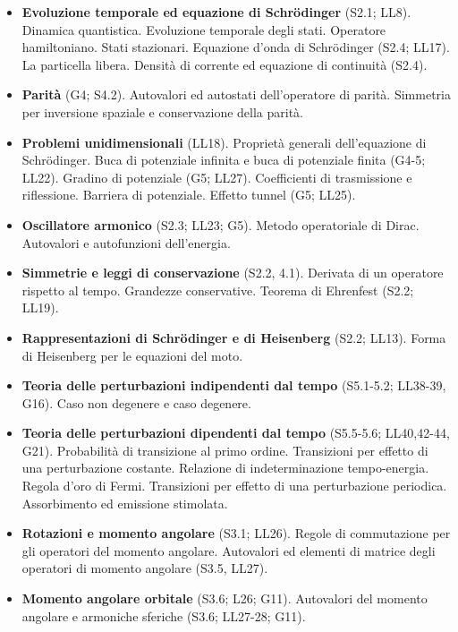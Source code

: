 \documentclass[a4paper,12pt,oneside]{book}
\begin{document}
\begin{itemize}
\item \textbf{Evoluzione temporale ed equazione di Schr\"{o}dinger} (S2.1; LL8). Dinamica quantistica. Evoluzione temporale degli stati. Operatore hamiltoniano. Stati stazionari. Equazione d'onda di Schr\"{o}dinger (S2.4; LL17). La particella libera. Densità di corrente ed equazione di continuità (S2.4).

\item \textbf{Parità} (G4; S4.2). Autovalori ed autostati dell'operatore di parità. Simmetria per inversione spaziale e conservazione della parità.

\item \textbf{Problemi unidimensionali} (LL18). Proprietà generali dell'equazione di Schr\"{o}dinger. Buca di potenziale infinita e buca di potenziale finita (G4-5; LL22). Gradino di potenziale (G5; LL27). Coefficienti di trasmissione e riflessione. Barriera di potenziale. Effetto tunnel (G5; LL25).

\item \textbf{Oscillatore armonico} (S2.3; LL23; G5). Metodo operatoriale di Dirac. Autovalori e autofunzioni dell'energia. 

\item \textbf{Simmetrie e leggi di conservazione} (S2.2, 4.1). Derivata di un operatore rispetto al tempo. Grandezze conservative. Teorema di Ehrenfest (S2.2; LL19).

\item \textbf{Rappresentazioni di Schr\"{o}dinger e di Heisenberg} (S2.2; LL13). Forma di Heisenberg per le equazioni del moto.

\item \textbf{Teoria delle perturbazioni indipendenti dal tempo} (S5.1-5.2; LL38-39, G16). Caso non degenere e caso degenere.

\item \textbf{Teoria delle perturbazioni dipendenti dal tempo} (S5.5-5.6; LL40,42-44, G21). Probabilità di transizione al primo ordine. Transizioni per effetto di una perturbazione costante. Relazione di indeterminazione tempo-energia. Regola d'oro di Fermi. Transizioni per effetto di una perturbazione periodica. Assorbimento ed emissione stimolata.

\item \textbf{Rotazioni e momento angolare} (S3.1; LL26). Regole di commutazione per gli operatori del momento angolare. Autovalori ed elementi di matrice degli operatori di momento angolare (S3.5, LL27).

\item \textbf{Momento angolare orbitale} (S3.6; L26; G11). Autovalori del momento angolare e armoniche sferiche (S3.6; LL27-28; G11). 


\end{itemize}
\end{document}
